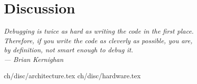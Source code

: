 \chapter{Discussion}\label{ch:disc}

\begin{flushright}{\slshape
    Debugging is twice as hard as writing the code in the first place.\\
    Therefore, if you write the code as cleverly as possible, you are,\\
    by definition, not smart enough to debug it.\\ \medskip
    --- Brian Kernighan}
\end{flushright}

 {ch/disc/architecture.tex}
 {ch/disc/hardware.tex}


